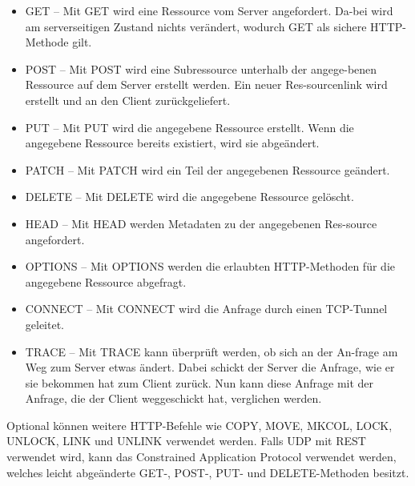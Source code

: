 \begin{itemize}
    \item GET -- Mit GET wird eine Ressource vom Server angefordert. Da-bei wird am serverseitigen Zustand nichts verändert, wodurch GET als sichere HTTP-Methode gilt.
    \item POST -- Mit POST wird eine Subressource unterhalb der angege-benen Ressource auf dem Server erstellt werden. Ein neuer Res-sourcenlink wird erstellt und an den Client zurückgeliefert.
    \item PUT -- Mit PUT wird die angegebene Ressource erstellt. Wenn die angegebene Ressource bereits existiert, wird sie abgeändert. 
    \item PATCH -- Mit PATCH wird ein Teil der angegebenen Ressource geändert. 
    \item DELETE -- Mit DELETE wird die angegebene Ressource gelöscht.
    \item HEAD -- Mit HEAD werden Metadaten zu der angegebenen Res-source angefordert. 
    \item OPTIONS -- Mit OPTIONS werden die erlaubten HTTP-Methoden für die angegebene Ressource abgefragt. 
    \item CONNECT -- Mit CONNECT wird die Anfrage durch einen TCP-Tunnel geleitet. 
    \item TRACE -- Mit TRACE kann überprüft werden, ob sich an der An-frage am Weg zum Server etwas ändert. Dabei schickt der Server die Anfrage, wie er sie bekommen hat zum Client zurück. Nun kann diese Anfrage mit der Anfrage, die der Client weggeschickt hat, verglichen werden. 
\end{itemize}

Optional können weitere HTTP-Befehle wie COPY, MOVE, MKCOL, LOCK, UNLOCK, LINK und UNLINK verwendet werden. Falls UDP mit REST verwendet wird, kann das Constrained Application Protocol verwendet werden, welches leicht abgeänderte GET-, POST-, PUT- und DELETE-Methoden besitzt. \cite{WikiREST}
